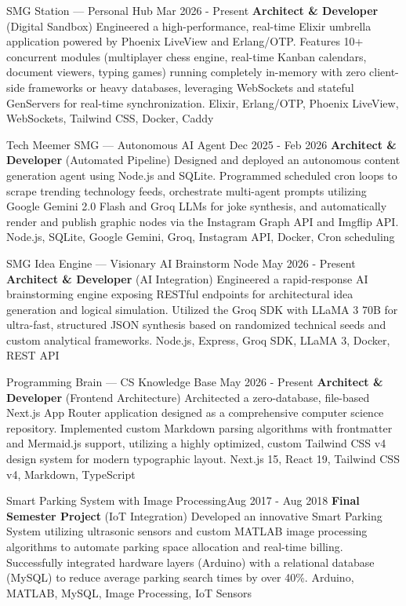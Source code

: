
\begin{projects}
        \project
	{SMG Station — Personal Hub} {Mar 2026 - Present}
	{{\textbf{Architect \& Developer} (Digital Sandbox)}}
	{Engineered a high-performance, real-time Elixir umbrella application powered by Phoenix LiveView and Erlang/OTP. Features 10+ concurrent modules (multiplayer chess engine, real-time Kanban calendars, document viewers, typing games) running completely in-memory with zero client-side frameworks or heavy databases, leveraging WebSockets and stateful GenServers for real-time synchronization.}
	{Elixir, Erlang/OTP, Phoenix LiveView, WebSockets, Tailwind CSS, Docker, Caddy}

        \project
	{Tech Meemer SMG — Autonomous AI Agent} {Dec 2025 - Feb 2026}
	{{\textbf{Architect \& Developer} (Automated Pipeline)}}
	{Designed and deployed an autonomous content generation agent using Node.js and SQLite. Programmed scheduled cron loops to scrape trending technology feeds, orchestrate multi-agent prompts utilizing Google Gemini 2.0 Flash and Groq LLMs for joke synthesis, and automatically render and publish graphic nodes via the Instagram Graph API and Imgflip API.}
	{Node.js, SQLite, Google Gemini, Groq, Instagram API, Docker, Cron scheduling}

        \project
	{SMG Idea Engine — Visionary AI Brainstorm Node} {May 2026 - Present}
	{{\textbf{Architect \& Developer} (AI Integration)}}
	{Engineered a rapid-response AI brainstorming engine exposing RESTful endpoints for architectural idea generation and logical simulation. Utilized the Groq SDK with LLaMA 3 70B for ultra-fast, structured JSON synthesis based on randomized technical seeds and custom analytical frameworks.}
	{Node.js, Express, Groq SDK, LLaMA 3, Docker, REST API}

        \project
	{Programming Brain — CS Knowledge Base} {May 2026 - Present}
	{{\textbf{Architect \& Developer} (Frontend Architecture)}}
	{Architected a zero-database, file-based Next.js App Router application designed as a comprehensive computer science repository. Implemented custom Markdown parsing algorithms with frontmatter and Mermaid.js support, utilizing a highly optimized, custom Tailwind CSS v4 design system for modern typographic layout.}
	{Next.js 15, React 19, Tailwind CSS v4, Markdown, TypeScript}

        \project
	{Smart Parking System with Image Processing}{Aug 2017 - Aug 2018}
	{{\textbf{Final Semester Project} (IoT Integration)}}
	{Developed an innovative Smart Parking System utilizing ultrasonic sensors and custom MATLAB image processing algorithms to automate parking space allocation and real-time billing. Successfully integrated hardware layers (Arduino) with a relational database (MySQL) to reduce average parking search times by over 40\%.}
	{Arduino, MATLAB, MySQL, Image Processing, IoT Sensors}


\end{projects}
